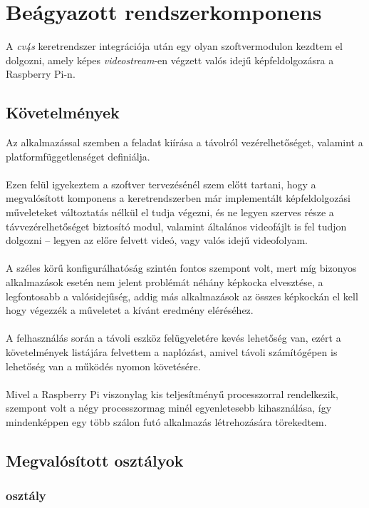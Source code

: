 \chapter{Beágyazott rendszerkomponens}

A \emph{cv4s} keretrendszer integrációja után egy olyan szoftvermodulon kezdtem el dolgozni, amely képes \textit{videostream}-en végzett valós idejű képfeldolgozásra a Raspberry Pi-n. 

\section{Követelmények}

Az alkalmazással szemben a feladat kiírása a távolról vezérelhetőséget, valamint a platformfüggetlenséget definiálja. \\
\\
Ezen felül igyekeztem a szoftver tervezésénél szem előtt tartani, hogy a megvalósított komponens a keretrendszerben már implementált képfeldolgozási műveleteket változtatás nélkül el tudja végezni, és ne legyen szerves része a távvezérelhetőséget biztosító modul, valamint általános videofájlt is fel tudjon dolgozni -- legyen az előre felvett videó, vagy valós idejű videofolyam.\\
\\
A széles körű konfigurálhatóság szintén fontos szempont volt, mert míg bizonyos alkalmazások esetén nem jelent problémát néhány képkocka elvesztése, a legfontosabb a valósidejűség, addig más alkalmazások az összes képkockán el kell hogy végezzék a műveletet a kívánt eredmény eléréséhez.\\
\\
A felhasználás során a távoli eszköz felügyeletére kevés lehetőség van, ezért a követelmények listájára felvettem a naplózást, amivel távoli számítógépen is lehetőség van a működés nyomon követésére.\\
\\
Mivel a Raspberry Pi viszonylag kis teljesítményű processzorral rendelkezik, szempont volt a négy processzormag minél egyenletesebb kihasználása, így mindenképpen egy több szálon futó alkalmazás létrehozására törekedtem.

\section{Megvalósított osztályok}

\subsection{ osztály}

